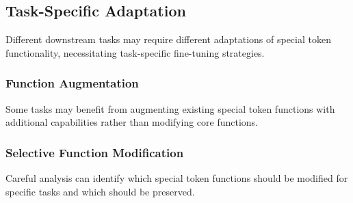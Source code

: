 \subsection{Task-Specific Adaptation}

Different downstream tasks may require different adaptations of special token functionality, necessitating task-specific fine-tuning strategies.

\subsubsection{Function Augmentation}

Some tasks may benefit from augmenting existing special token functions with additional capabilities rather than modifying core functions.

\subsubsection{Selective Function Modification}

Careful analysis can identify which special token functions should be modified for specific tasks and which should be preserved.